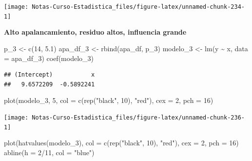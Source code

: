 \documentclass[
  12pt,
]{book}
\newenvironment{Shaded}{\begin{snugshade}}{\end{snugshade}}
\newcommand{\AttributeTok}[1]{\textcolor[rgb]{0.77,0.63,0.00}{#1}}
\newcommand{\DecValTok}[1]{\textcolor[rgb]{0.00,0.00,0.81}{#1}}
\newcommand{\FloatTok}[1]{\textcolor[rgb]{0.00,0.00,0.81}{#1}}
\newcommand{\FunctionTok}[1]{\textcolor[rgb]{0.00,0.00,0.00}{#1}}
\newcommand{\NormalTok}[1]{#1}
\newcommand{\OtherTok}[1]{\textcolor[rgb]{0.56,0.35,0.01}{#1}}
\newcommand{\SpecialCharTok}[1]{\textcolor[rgb]{0.00,0.00,0.00}{#1}}
\newcommand{\StringTok}[1]{\textcolor[rgb]{0.31,0.60,0.02}{#1}}
\theoremstyle{definition}
\theoremstyle{definition}
\theoremstyle{definition}
\theoremstyle{remark}
\begin{document}
\begin{center}\texttt{[image: Notas-Curso-Estadistica\_files/figure-latex/unnamed-chunk-234-1]} \end{center}

\textbf{Alto apalancamiento, residuo altos, influencia grande}

\begin{Shaded}
\begin{Highlighting}[]
\NormalTok{p\_3 }\OtherTok{\textless{}{-}} \FunctionTok{c}\NormalTok{(}\DecValTok{14}\NormalTok{, }\FloatTok{5.1}\NormalTok{)}
\NormalTok{apa\_df\_3 }\OtherTok{\textless{}{-}} \FunctionTok{rbind}\NormalTok{(apa\_df, p\_3)}
\NormalTok{modelo\_3 }\OtherTok{\textless{}{-}} \FunctionTok{lm}\NormalTok{(y }\SpecialCharTok{\textasciitilde{}}\NormalTok{ x, }\AttributeTok{data =}\NormalTok{ apa\_df\_3)}
\FunctionTok{coef}\NormalTok{(modelo\_3)}
\end{Highlighting}
\end{Shaded}

\begin{verbatim}
## (Intercept)           x 
##   9.6572209  -0.5892241
\end{verbatim}

\begin{Shaded}
\begin{Highlighting}[]
\FunctionTok{plot}\NormalTok{(modelo\_3, }\DecValTok{5}\NormalTok{, }\AttributeTok{col =} \FunctionTok{c}\NormalTok{(}\FunctionTok{rep}\NormalTok{(}\StringTok{"black"}\NormalTok{, }\DecValTok{10}\NormalTok{), }\StringTok{"red"}\NormalTok{), }
    \AttributeTok{cex =} \DecValTok{2}\NormalTok{, }\AttributeTok{pch =} \DecValTok{16}\NormalTok{)}
\end{Highlighting}
\end{Shaded}

\begin{center}\texttt{[image: Notas-Curso-Estadistica\_files/figure-latex/unnamed-chunk-236-1]} \end{center}

\begin{Shaded}
\begin{Highlighting}[]
\FunctionTok{plot}\NormalTok{(}\FunctionTok{hatvalues}\NormalTok{(modelo\_3), }\AttributeTok{col =} \FunctionTok{c}\NormalTok{(}\FunctionTok{rep}\NormalTok{(}\StringTok{"black"}\NormalTok{, }\DecValTok{10}\NormalTok{), }
    \StringTok{"red"}\NormalTok{), }\AttributeTok{cex =} \DecValTok{2}\NormalTok{, }\AttributeTok{pch =} \DecValTok{16}\NormalTok{)}
\FunctionTok{abline}\NormalTok{(}\AttributeTok{h =} \DecValTok{2}\SpecialCharTok{/}\DecValTok{11}\NormalTok{, }\AttributeTok{col =} \StringTok{"blue"}\NormalTok{)}
\end{Highlighting}
\end{Shaded}
\end{document}
